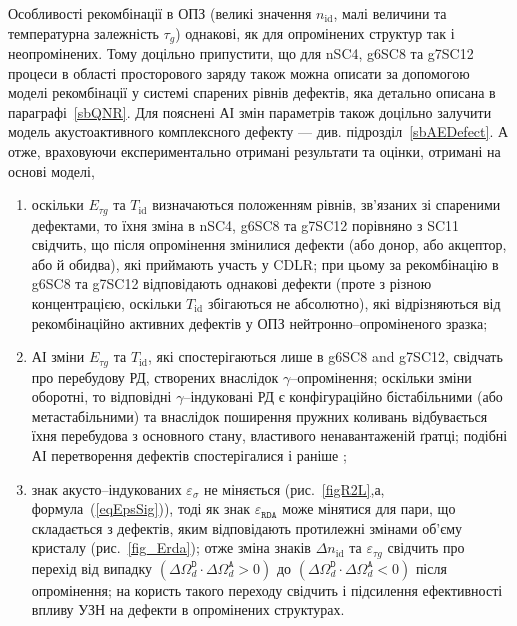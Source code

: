 Особливості рекомбінації в ОПЗ (великі значення $n_\mathrm{id}$, малі величини та температурна залежність $\tau_g$)
однакові, як  для опромінених структур так і неопромінених.
Тому доцільно припустити, що для nSC4, g6SC8 та g7SC12 процеси в області просторового заряду також можна описати
за допомогою моделі рекомбінації у системі спарених рівнів дефектів, яка детально описана в параграфі~\ref{sbQNR}.
Для пояснені АІ змін параметрів також доцільно залучити модель акустоактивного комплексного дефекту --- див. підрозділ~\ref{sbAEDefect}.
А отже, враховуючи експериментально отримані результати та оцінки, отримані на основі моделі,
\begin{enumerate}[label=\asbuk*),leftmargin=0em,itemindent=1.5em]
\item оскільки $E_{\tau g}$ та $T_{\mathrm{id}}$  визначаються положенням рівнів, зв'язаних
зі спареними дефектами, то їхня зміна в nSC4, g6SC8 та g7SC12 порівняно з SC11 свідчить, що
після опромінення змінилися дефекти (або донор, або акцептор, або й обидва), які приймають участь у CDLR;
при цьому за рекомбінацію в g6SC8 та g7SC12 відповідають однакові дефекти (проте з різною концентрацією,
 оскільки $T_{\mathrm{id}}$ збігаються не абсолютно), які відрізняються від рекомбінаційно активних дефектів у ОПЗ нейтронно--опроміненого зразка;

\item  АІ зміни   $E_{\tau g}$ та $T_{\mathrm{id}}$, які спостерігаються лише в g6SC8 and g7SC12,
 свідчать про перебудову РД, створених внаслідок $\gamma$--опромінення;
 оскільки зміни оборотні, то  відповідні
 $\gamma$--індуковані РД є конфігураційно бістабільними (або метастабільними) та внаслідок поширення пружних коливань відбувається їхня перебудова з основного стану,
 властивого ненавантаженій ґратці;
 подібні АІ перетворення дефектів спостерігалися і раніше \cite{Wosinski,Ostapenko1994,YOlikhTPL2011r};

 \item знак акусто--індукованих $\varepsilon_{\sigma}$ не міняється (рис.~\ref{figR2L},а, формула~(\ref{eqEpsSig})), тоді як
  знак  $\varepsilon_{\mathtt{RDA}}$  може мінятися для пари, що складається з дефектів, яким відповідають протилежні
  змінами об'єму кристалу (рис.~\ref{fig_Erda});
  отже зміна знаків $\Delta n_{\mathrm{id}}$ та $\varepsilon_{\tau g}$ свідчить про перехід від випадку
  $(\Delta\Omega_d^\mathtt{D}\cdot\Delta\Omega_d^\mathtt{A}>0)$ до
  $(\Delta\Omega_d^\mathtt{D}\cdot\Delta\Omega_d^\mathtt{A}<0)$ після опромінення;
  на користь такого переходу свідчить і підсилення ефективності впливу УЗН на дефекти в опромінених структурах.
\end{enumerate}

